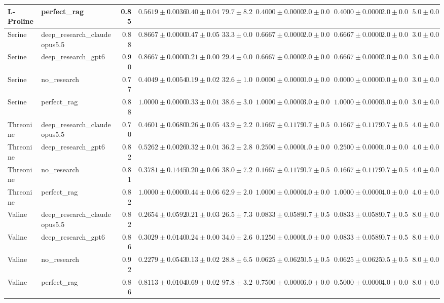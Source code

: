 \begin{table}[htbp]
\begin{tabular}{llrrrrrrrrr}
L-Proline & perfect_rag & 0.85 & \cellcolor{green!25}$0.5619 \pm 0.0036$ & $0.40 \pm 0.04$ & $79.7 \pm 8.2$ & $0.4000 \pm 0.0000$ & $2.0 \pm 0.0$ & $0.4000 \pm 0.0000$ & $2.0 \pm 0.0$ & $5.0 \pm 0.0$ \\
\midrule
Serine & deep_research_claudeopus5.5 & 0.88 & $0.8667 \pm 0.0000$ & $0.47 \pm 0.05$ & $33.3 \pm 0.0$ & $0.6667 \pm 0.0000$ & $2.0 \pm 0.0$ & $0.6667 \pm 0.0000$ & $2.0 \pm 0.0$ & $3.0 \pm 0.0$ \\
Serine & deep_research_gpt6 & 0.90 & $0.8667 \pm 0.0000$ & $0.21 \pm 0.00$ & $29.4 \pm 0.0$ & $0.6667 \pm 0.0000$ & $2.0 \pm 0.0$ & $0.6667 \pm 0.0000$ & $2.0 \pm 0.0$ & $3.0 \pm 0.0$ \\
Serine & no_research & 0.77 & \cellcolor{red!25}$0.4049 \pm 0.0054$ & $0.19 \pm 0.02$ & $32.6 \pm 1.0$ & $0.0000 \pm 0.0000$ & $0.0 \pm 0.0$ & $0.0000 \pm 0.0000$ & $0.0 \pm 0.0$ & $3.0 \pm 0.0$ \\
Serine & perfect_rag & 0.88 & \cellcolor{green!25}$1.0000 \pm 0.0000$ & $0.33 \pm 0.01$ & $38.6 \pm 3.0$ & $1.0000 \pm 0.0000$ & $3.0 \pm 0.0$ & $1.0000 \pm 0.0000$ & $3.0 \pm 0.0$ & $3.0 \pm 0.0$ \\
\midrule
Threonine & deep_research_claudeopus5.5 & 0.70 & $0.4601 \pm 0.0680$ & $0.26 \pm 0.05$ & $43.9 \pm 2.2$ & $0.1667 \pm 0.1179$ & $0.7 \pm 0.5$ & $0.1667 \pm 0.1179$ & $0.7 \pm 0.5$ & $4.0 \pm 0.0$ \\
Threonine & deep_research_gpt6 & 0.82 & $0.5262 \pm 0.0026$ & $0.32 \pm 0.01$ & $36.2 \pm 2.8$ & $0.2500 \pm 0.0000$ & $1.0 \pm 0.0$ & $0.2500 \pm 0.0000$ & $1.0 \pm 0.0$ & $4.0 \pm 0.0$ \\
Threonine & no_research & 0.81 & \cellcolor{red!25}$0.3781 \pm 0.1445$ & $0.20 \pm 0.06$ & $38.0 \pm 7.2$ & $0.1667 \pm 0.1179$ & $0.7 \pm 0.5$ & $0.1667 \pm 0.1179$ & $0.7 \pm 0.5$ & $4.0 \pm 0.0$ \\
Threonine & perfect_rag & 0.82 & \cellcolor{green!25}$1.0000 \pm 0.0000$ & $0.44 \pm 0.06$ & $62.9 \pm 2.0$ & $1.0000 \pm 0.0000$ & $4.0 \pm 0.0$ & $1.0000 \pm 0.0000$ & $4.0 \pm 0.0$ & $4.0 \pm 0.0$ \\
\midrule
Valine & deep_research_claudeopus5.5 & 0.82 & $0.2654 \pm 0.0592$ & $0.21 \pm 0.03$ & $26.5 \pm 7.3$ & $0.0833 \pm 0.0589$ & $0.7 \pm 0.5$ & $0.0833 \pm 0.0589$ & $0.7 \pm 0.5$ & $8.0 \pm 0.0$ \\
Valine & deep_research_gpt6 & 0.86 & $0.3029 \pm 0.0140$ & $0.24 \pm 0.00$ & $34.0 \pm 2.6$ & $0.1250 \pm 0.0000$ & $1.0 \pm 0.0$ & $0.0833 \pm 0.0589$ & $0.7 \pm 0.5$ & $8.0 \pm 0.0$ \\
Valine & no_research & 0.92 & \cellcolor{red!25}$0.2279 \pm 0.0543$ & $0.13 \pm 0.02$ & $28.8 \pm 6.5$ & $0.0625 \pm 0.0625$ & $0.5 \pm 0.5$ & $0.0625 \pm 0.0625$ & $0.5 \pm 0.5$ & $8.0 \pm 0.0$ \\
Valine & perfect_rag & 0.86 & \cellcolor{green!25}$0.8113 \pm 0.0104$ & $0.69 \pm 0.02$ & $97.8 \pm 3.2$ & $0.7500 \pm 0.0000$ & $6.0 \pm 0.0$ & $0.5000 \pm 0.0000$ & $4.0 \pm 0.0$ & $8.0 \pm 0.0$ \\
\bottomrule
\end{tabular}
\end{table}